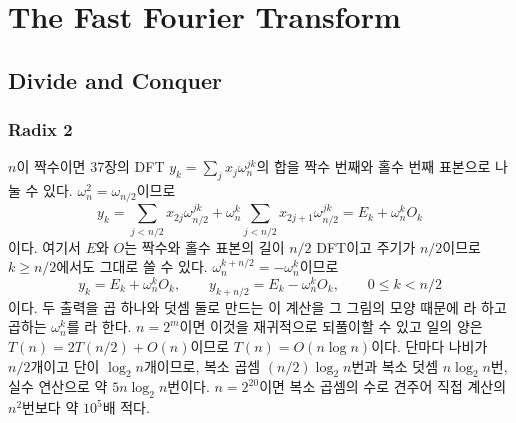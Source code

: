 \chapter{The Fast Fourier Transform}
\label{ch:fft}


\section{Divide and Conquer}
\label{sec:cooley-tukey}

\subsection{Radix 2}

$n$이 짝수이면 37장의 DFT $y_k=\sum_jx_j\omega_n^{jk}$의 합을 짝수 번째와 홀수 번째 표본으로 나눌 수 있다. $\omega_n^2=\omega_{n/2}$이므로
\[
y_k=\sum_{j<n/2}x_{2j}\omega_{n/2}^{jk}+\omega_n^k\sum_{j<n/2}x_{2j+1}\omega_{n/2}^{jk}=E_k+\omega_n^kO_k
\]
이다. 여기서 $E$와 $O$는 짝수와 홀수 표본의 길이 $n/2$ DFT이고 주기가 $n/2$이므로 $k\ge n/2$에서도 그대로 쓸 수 있다. $\omega_n^{k+n/2}=-\omega_n^k$이므로
\begin{equation}
\label{eq:butterfly}
y_k=E_k+\omega_n^kO_k,\qquad y_{k+n/2}=E_k-\omega_n^kO_k,\qquad0\le k<n/2
\end{equation}
이다. 두 출력을 곱 하나와 덧셈 둘로 만드는 이 계산을 그 그림의 모양 때문에 라 하고 곱하는 $\omega_n^k$를 라 한다. $n=2^m$이면 이것을 재귀적으로 되풀이할 수 있고 일의 양은 $T(n)=2T(n/2)+O(n)$이므로 $T(n)=O(n\log n)$이다. 단마다 나비가 $n/2$개이고 단이 $\log_2n$개이므로, 복소 곱셈 $(n/2)\log_2n$번과 복소 덧셈 $n\log_2n$번, 실수 연산으로 약 $5n\log_2n$번이다. $n=2^{20}$이면 복소 곱셈의 수로 견주어 직접 계산의 $n^2$번보다 약 $10^5$배 적다.


